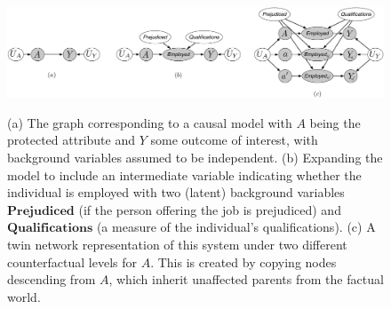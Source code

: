 \begin{figure}[th!]
\begin{center}
\vspace{-1ex}
\centerline{\includegraphics[width=\textwidth]{implications_fig.pdf}}
\vspace{-2ex}
\label{fig:ex1}
  \caption{(a) The graph corresponding to a causal model with $A$ being the protected attribute
    and $Y$ some outcome of interest, with background variables assumed to be independent.
    (b) Expanding the model to include an intermediate variable indicating whether the individual
    is employed with two (latent) background variables $\textbf{Prejudiced}$ (if the person  offering the job is prejudiced) and $\textbf{Qualifications}$ (a measure of the individual's qualifications). (c) A twin network representation of this system \citep{pearl:00}
    under two different counterfactual levels for $A$. This is created by copying nodes descending from $A$, which inherit unaffected parents from the factual world.\vspace{-5ex}}
\vspace{-2ex}
\end{center}

\end{figure}
